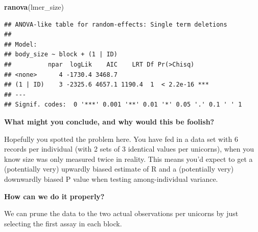 \documentclass[
  12pt,
]{book}
\makeatletter
\newenvironment{Shaded}{\begin{snugshade}}{\end{snugshade}}
\newcommand{\DataTypeTok}[1]{\textcolor[rgb]{0.13,0.29,0.53}{#1}}
\newcommand{\DecValTok}[1]{\textcolor[rgb]{0.00,0.00,0.81}{#1}}
\newcommand{\KeywordTok}[1]{\textcolor[rgb]{0.13,0.29,0.53}{\textbf{#1}}}
\newcommand{\NormalTok}[1]{#1}
\newcommand{\OperatorTok}[1]{\textcolor[rgb]{0.81,0.36,0.00}{\textbf{#1}}}
\newcommand{\StringTok}[1]{\textcolor[rgb]{0.31,0.60,0.02}{#1}}
\newenvironment{kframe}{%
\medskip{}
\setlength{\fboxsep}{.8em}
\def\at@end@of@kframe{}%
\ifinner\ifhmode%
 \def\at@end@of@kframe{\end{minipage}}%
 \begin{minipage}{\columnwidth}%
\fi\fi%
\def\FrameCommand##1{\hskip\@totalleftmargin \hskip-\fboxsep
\colorbox{incolor}{##1}\hskip-\fboxsep
    \hskip-\linewidth \hskip-\@totalleftmargin \hskip\columnwidth}%
\MakeFramed {\advance\hsize-\width
  \@totalleftmargin\z@ \linewidth\hsize
  \@setminipage}}%
{\par\unskip\endMakeFramed%
\at@end@of@kframe}
\newenvironment{rmdblock}[1]
 {
 \begin{itemize}
 \renewcommand{\labelitemi}{
   \raisebox{-.7\height}[0pt][0pt]{
     {\setkeys{Gin}{width=3em,keepaspectratio}\texttt{[image: images/icons/\#1]}}
   }
 }
 \begin{kframe}
 \setlength{\fboxsep}{1em}
 \item
 }
 {
 \end{kframe}
 \end{itemize}
 }
\newenvironment{rmdcode}
  {\begin{rmdblock}{code}}
  {\end{rmdblock}}
\makeatother
\begin{document}
\begin{Shaded}
\begin{Highlighting}[]
\KeywordTok{ranova}\NormalTok{(lmer\_size)}
\end{Highlighting}
\end{Shaded}

\begin{verbatim}
## ANOVA-like table for random-effects: Single term deletions
## 
## Model:
## body_size ~ block + (1 | ID)
##          npar  logLik    AIC    LRT Df Pr(>Chisq)    
## <none>      4 -1730.4 3468.7                         
## (1 | ID)    3 -2325.6 4657.1 1190.4  1  < 2.2e-16 ***
## ---
## Signif. codes:  0 '***' 0.001 '**' 0.01 '*' 0.05 '.' 0.1 ' ' 1
\end{verbatim}

\begin{rmdcode}
\textbf{What might you conclude, and why would this be foolish?}
\end{rmdcode}

Hopefully you spotted the problem here. You have fed in a data set with 6 records per individual (with 2 sets of 3 identical values per unicorns), when you know size was only measured twice in reality. This means you'd expect to get a (potentially very) upwardly biased estimate of R and a (potentially very) downwardly biased P value when testing among-individual variance.

\begin{rmdcode}
\textbf{How can we do it properly?}
\end{rmdcode}

We can prune the data to the two actual observations per unicorns by just selecting the first assay in each block.

\begin{Shaded}
\end{Shaded}
\end{document}

